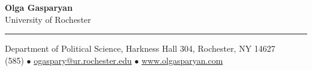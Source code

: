 \documentclass[letterpaper,11pt,oneside]{article}
\begin{document}
\begin{center}
  \noindent \Large{\textbf{Olga Gasparyan}}  \\
\vspace{0.3ex}
\Large{University of Rochester}
\end{center}
\begin{center}
\noindent\rule{16cm}{0.4pt}
\end{center}
\normalsize



\begin{center}
Department of Political Science, Harkness Hall 304, Rochester, NY 14627 \\
(585) $\bullet$  \href{mailto:ogaspary@ur.rochester.edu}{ogaspary@ur.rochester.edu} $\bullet$ \href{www.olgasparyan.com}{www.olgasparyan.com}
\\

\end{center}

\vspace{0.8em}

\end{document}
